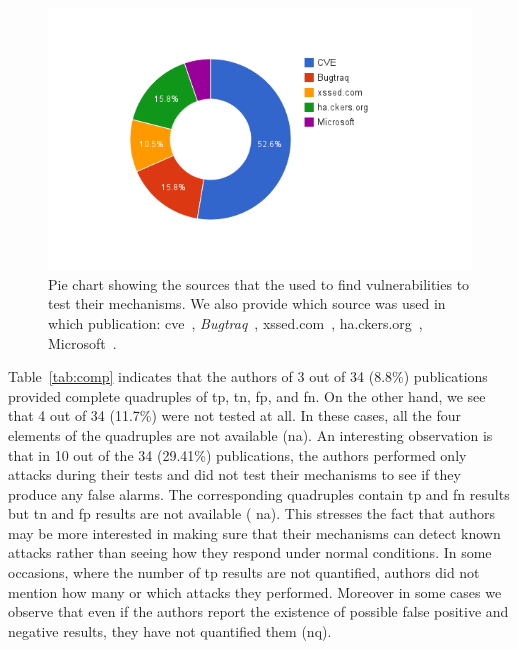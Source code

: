 \documentclass[conference]{IEEEtran}
\begin{document}
\begin{figure}
\begin{center}
\leavevmode
\includegraphics[scale=0.47]{defect-percentages.png}
\end{center}
\caption{\label{fig:defect_sources}Pie chart showing the sources
that the used to find vulnerabilities to test
their mechanisms. We also provide which source was used
in which publication:
{\sc cve}~\cite{XBS06,NLC07,PMP11,BK04,BV08,JB07,SMS13,WPLKK09,JKK06a,PS11},
{\it Bugtraq}~\cite{PB05,KKVJ06,JEP08},
{\sc xss}ed.com~\cite{NSS06,APKLM10},
ha.ckers.org~\cite{TNH07,PSC09,LV09},
Microsoft~\cite{RDWDE07}.}
\end{figure}

Table~\ref{tab:comp} indicates that the authors of 3 out of 34 (8.8\%)
publications provided complete quadruples of {\sc tp}, {\sc tn}, 
{\sc fp}, and {\sc fn}. On the other hand, we
see that 4 out of 34 (11.7\%) were not tested at all. In these cases,
all the four elements of the quadruples are not available ({\sc na}).
An interesting observation is that in 10 out of the 34 (29.41\%)
publications, the authors performed only attacks during their tests
and did not test their mechanisms to see if they produce any false
alarms. The corresponding quadruples contain {\sc tp} and {\sc fn}
results but {\sc tn} and {\sc fp} results are not available ({\sc
  na}). This stresses the fact that authors may be more interested in
making sure that their mechanisms can detect known attacks rather than
seeing how they respond under normal conditions. In some occasions,
where the number of {\sc tp} results are not quantified, authors did
not mention how many or which attacks they performed. Moreover in some
cases we observe that even if the authors report the existence of
possible false positive and negative results, they have not quantified
them ({\sc nq}).
\end{document}
